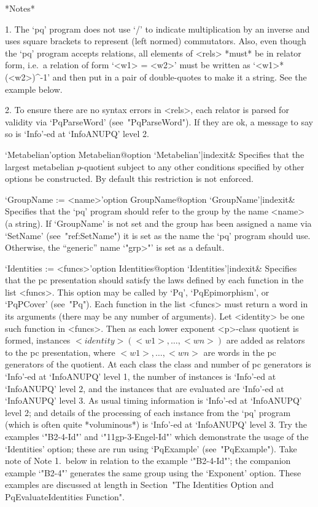 *Notes*
\beginlist%

\item{1.}
The `pq' program does not  use  `/'  to  indicate  multiplication  by  an
inverse and uses square brackets to represent (left normed)  commutators.
Also, even though the `pq' program accepts  relations,  all  elements  of
<rels> *must* be in relator form, i.e.~a relation of form `<w1>  =  <w2>'
must  be  written  as  `<w1>*(<w2>)^-1'  and  then  put  in  a  pair   of
double-quotes to make it a string. See the example below.

\item{2.}
To ensure there are no syntax errors in <rels>, each  relator  is  parsed
for validity via `PqParseWord' (see~"PqParseWord"). If  they  are  ok,  a
message to say so is `Info'-ed at `InfoANUPQ' level 2.

\endlist

\>`Metabelian'{option Metabelian}@{option `Metabelian'|indexit}&
Specifies that the largest metabelian $p$-quotient subject to  any  other
conditions specified by other options be  constructed.  By  default  this
restriction is not enforced.

\>`GroupName := <name>'{option GroupName}@{option `GroupName'|indexit}&
Specifies that the `pq' program should refer to the  group  by  the  name
<name> (a string). If `GroupName' is not  set  and  the  group  has  been
assigned a name via `SetName' (see~"ref:SetName") it is set as  the  name
the `pq' program should use. Otherwise, the ``generic''  name  `"\<grp>"'
is set as a default.

\>`Identities := <funcs>'{option Identities}@{option `Identities'|indexit}&
Specifies that the pc presentation should satisfy  the  laws  defined  by
each function in the list <funcs>. This option may  be  called  by  `Pq',
`PqEpimorphism', or `PqPCover' (see~"Pq").  Each  function  in  the  list
<funcs> must return a word in its arguments (there may be any  number  of
arguments). Let <identity> be one such function in <funcs>. Then as  each
lower exponent <p>-class quotient is formed, instances  $<identity>(<w1>,
\dots, <wn>)$ are added as relators to the pc presentation, where  $<w1>,
\dots, <wn>$ are words in the pc generators  of  the  quotient.  At  each
class the class and number of pc generators is `Info'-ed  at  `InfoANUPQ'
level 1, the number of instances is `Info'-ed at `InfoANUPQ' level 2, and
the instances that are evaluated are `Info'-ed at `InfoANUPQ' level 3. As
usual timing information is `Info'-ed at `InfoANUPQ' level 2; and details
of the processing of each instance from the `pq' program (which is  often
quite *voluminous*) is `Info'-ed at `InfoANUPQ' level 3. Try the examples
`"B2-4-Id"' and `"11gp-3-Engel-Id"' which demonstrate the  usage  of  the
`Identities' option; these are run using  `PqExample'  (see~"PqExample").
Take note of Note 1.~below in relation to the  example  `"B2-4-Id"';  the
companion example `"B2-4"' generates the same group using the  `Exponent'
option. These examples are discussed at length in Section~"The Identities
Option and PqEvaluateIdentities Function".

